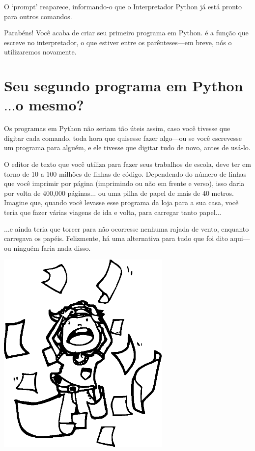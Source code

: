 O `prompt' reaparece, informando-o que o Interpretador Python já está pronto para outros comandos.

\noindent
Parabéns! Você acaba de criar seu primeiro programa em Python.  é a função que escreve no interpretador, o que estiver entre os parênteses---em breve, nós o utilizaremos novamente.

\section{Seu segundo programa em Python$\ldots$o mesmo?}

Os programas em Python não seriam tão úteis assim, caso você tivesse que digitar cada comando, toda hora que quisesse fazer algo---ou se você escrevesse um programa para alguém, e ele tivesse que digitar tudo de novo, antes de usá-lo.

O editor de texto que você utiliza para fazer seus trabalhos de escola, deve ter em torno de 10 a 100 milhões de linhas de código. Dependendo do número de linhas que você imprimir por página (imprimindo ou não em frente e verso), isso daria por volta de 400,000 páginas$\ldots$ ou uma pilha de papel de mais de 40 metros.
Imagine que, quando você levasse esse programa da loja para a sua casa, você teria que fazer várias viagens de ida e volta, para carregar tanto papel$\ldots$

$\ldots$e ainda teria que torcer para não ocorresse nenhuma rajada de vento, enquanto carregava os papéis. Felizmente, há uma alternativa para tudo que foi dito aqui---ou ninguém faria nada disso.

\begin{center}
\includegraphics*[width=85mm]{eps/pullinghair.eps}
\end{center}

